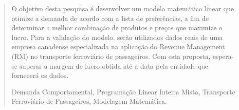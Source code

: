 \begin{quotation}
	O objetivo desta pesquisa é desenvolver um modelo matemático linear que otimize a demanda de acordo com a lista de preferências, a fim de determinar a melhor combinação de produtos e preços que maximize o lucro. Para a validação do modelo, serão utilizados dados reais de uma empresa canadense especializada na aplicação do Revenue Management (RM) no transporte ferroviário de passageiros. Com esta proposta, espera-se superar a margem de lucro obtida até a data pela entidade que fornecerá os dados.

	\vspace{0.5cm}

	 Demanda Comportamental, Programação Linear Inteira Mista, Transporte Ferroviário de Passageiros, Modelagem Matemática.

\end{quotation}

